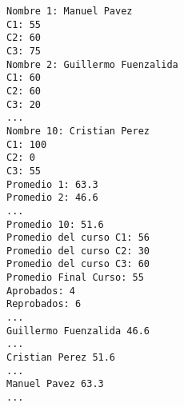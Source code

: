 \begin{lstlisting}
Nombre 1: Manuel Pavez
C1: 55
C2: 60
C3: 75
Nombre 2: Guillermo Fuenzalida
C1: 60
C2: 60
C3: 20
...
Nombre 10: Cristian Perez
C1: 100
C2: 0
C3: 55
Promedio 1: 63.3
Promedio 2: 46.6
...
Promedio 10: 51.6
Promedio del curso C1: 56
Promedio del curso C2: 30
Promedio del curso C3: 60
Promedio Final Curso: 55
Aprobados: 4
Reprobados: 6
...
Guillermo Fuenzalida 46.6
...
Cristian Perez 51.6
...
Manuel Pavez 63.3
...
\end{lstlisting}

